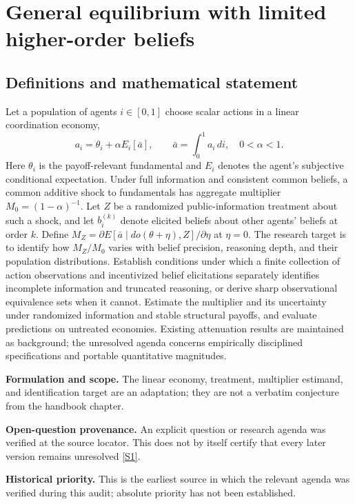 \documentclass[11pt]{article}
\newcommand{\sref}[2]{\hyperlink{source:#1:#2}{[S#2]}}
\begin{document}
\section*{General equilibrium with limited higher-order beliefs}\label{30007553}
\subsection{Definitions and mathematical statement}
Let a population of agents \(i\in[0,1]\) choose scalar actions in a linear coordination economy,
\[
 a_i=\theta_i+\alpha E_i[\bar a],\qquad \bar a=\int_0^1a_i\,di,\quad0<\alpha<1.
\]
Here \(\theta_i\) is the payoff-relevant fundamental and \(E_i\) denotes the agent's subjective conditional expectation. Under full information and consistent common beliefs, a common additive shock to fundamentals has aggregate multiplier \(M_0=(1-\alpha)^{-1}\). Let \(Z\) be a randomized public-information treatment about such a shock, and let \(b_i^{(k)}\) denote elicited beliefs about other agents' beliefs at order \(k\). Define \(M_Z=\partial E[\bar a\mid do(\theta+\eta),Z]/\partial\eta\) at \(\eta=0\). The research target is to identify how \(M_Z/M_0\) varies with belief precision, reasoning depth, and their population distributions. Establish conditions under which a finite collection of action observations and incentivized belief elicitations separately identifies incomplete information and truncated reasoning, or derive sharp observational equivalence sets when it cannot. Estimate the multiplier and its uncertainty under randomized information and stable structural payoffs, and evaluate predictions on untreated economies. Existing attenuation results are maintained as background; the unresolved agenda concerns empirically disciplined specifications and portable quantitative magnitudes.

\par\textbf{Formulation and scope.} The linear economy, treatment, multiplier estimand, and identification target are an adaptation; they are not a verbatim conjecture from the handbook chapter.

\par\textbf{Open-question provenance.} An explicit question or research agenda was verified at the source locator. This does not by itself certify that every later version remains unresolved \sref{30007553}{1}.

\par\textbf{Historical priority.} This is the earliest source in which the relevant agenda was verified during this audit; absolute priority has not been established.
\end{document}
